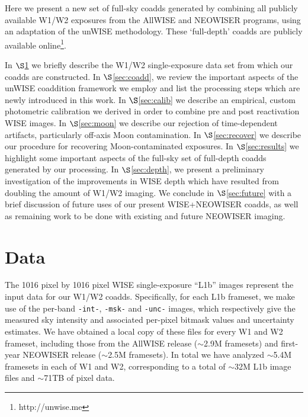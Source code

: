 \documentclass{emulateapj}
\begin{document}

Here we present a new set of full-sky coadds generated by
combining all publicly available W1/W2 exposures from the AllWISE and NEOWISER
programs, using an adaptation of the \cite{lang14} unWISE methodology. These 
`full-depth' coadds are publicly available online\footnote{http://unwise.me}.

In $\S$\ref{sec:data} we briefly describe the W1/W2 single-exposure data set 
from which our coadds are constructed. In $\S$\ref{sec:coadd}, we review the 
important aspects of the unWISE coaddition framework we employ and list the 
processing steps which are newly introduced in this work. In 
$\S$\ref{sec:calib} we describe an empirical, custom photometric calibration we
derived in order to combine pre and post reactivation WISE images. In 
$\S$\ref{sec:moon} we describe our rejection of time-dependent artifacts, 
particularly off-axis Moon contamination. In $\S$\ref{sec:recover} we describe
our procedure for recovering Moon-contaminated exposures. In 
$\S$\ref{sec:results} we highlight some important aspects of the full-sky set 
of full-depth coadds generated by our processing. In $\S$\ref{sec:depth}, we 
present a preliminary investigation of the improvements in WISE depth which 
have resulted from doubling the amount of W1/W2 imaging. We conclude in 
$\S$\ref{sec:future} with a brief discussion of future uses of our present 
WISE+NEOWISER coadds, as well as remaining work to be done with existing and 
future NEOWISER imaging.

\section{Data}
\label{sec:data}

The 1016 pixel by 1016 pixel WISE single-exposure ``L1b'' images represent
the input data for our W1/W2 coadds. Specifically, for each L1b frameset, we 
make use of the per-band \verb|-int-|, \verb|-msk-| and \verb|-unc-| images, 
which respectively give the measured sky intensity and associated per-pixel 
bitmask values and uncertainty estimates. We have obtained a local copy of 
these files for every W1 and W2 frameset, including those from the AllWISE 
release ($\sim$2.9M framesets) and first-year NEOWISER release ($\sim$2.5M 
framesets). In total we have analyzed $\sim$5.4M framesets in each of W1 and 
W2, corresponding to a total of $\sim$32M L1b image files and $\sim$71TB of 
pixel data.
\end{document}
